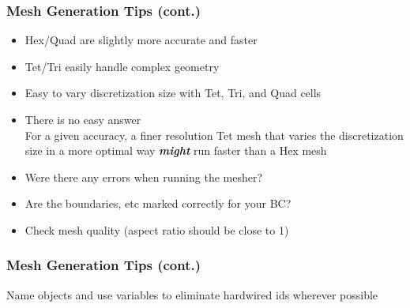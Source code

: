 \documentclass[aspectratio=169]{beamer}
\begin{document}
\begin{frame}
  \frametitle{Mesh Generation Tips (cont.)}
 
  \begin{itemize}
    \begin{itemize}
    \item Hex/Quad are slightly more accurate and faster
    \item Tet/Tri easily handle complex geometry
    \item Easy to vary discretization size with Tet, Tri, and Quad cells
    \item There is no easy answer\\
      For a given accuracy, a finer resolution Tet mesh that varies
      the discretization size in a more optimal way {\bf\it might} run
      faster than a Hex mesh
    \end{itemize}
    \begin{itemize}
    \item Were there any errors when running the mesher?
    \item Are the boundaries, etc marked correctly for your BC?
    \item Check mesh quality (aspect ratio should be close to 1)
    \end{itemize}
  \end{itemize}

\end{frame}


\begin{frame}
  \frametitle{Mesh Generation Tips  (cont.)}
  \summary{}

  \begin{description}
     {Name objects and use
      variables to eliminate hardwired ids wherever possible}
  \end{description}

\end{frame}
\end{document}
